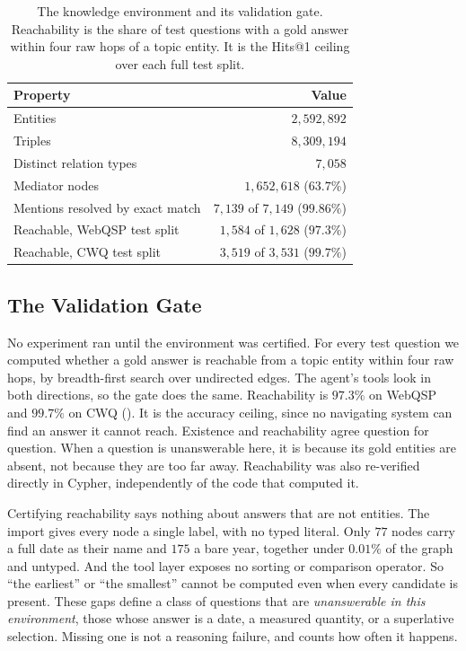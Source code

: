 \begin{table}[!t]
\caption{The knowledge environment and its validation gate. Reachability is the
  share of test questions with a gold answer within four raw hops of a topic
  entity. It is the Hits@1 ceiling over each full test split.}
\label{tab:environment}
\centering
\small
\begin{tabular}{@{}lr@{}}
\toprule
Property & Value \\
\midrule
Entities & $2{,}592{,}892$ \\
Triples & $8{,}309{,}194$ \\
Distinct relation types & $7{,}058$ \\
Mediator nodes & $1{,}652{,}618$ ($63.7\%$) \\
Mentions resolved by exact match & $7{,}139$ of $7{,}149$ ($99.86\%$) \\
\midrule
Reachable, WebQSP test split & $1{,}584$ of $1{,}628$ ($97.3\%$) \\
Reachable, CWQ test split & $3{,}519$ of $3{,}531$ ($99.7\%$) \\
\bottomrule
\end{tabular}
\end{table}

\subsection{The Validation Gate}\label{sec:gate}

No experiment ran until the environment was certified. For every test question
we computed whether a gold answer is reachable from a topic entity within four
raw hops, by breadth-first search over undirected edges. The agent's tools look
in both directions, so the gate does the same. Reachability is $97.3\%$ on
WebQSP and $99.7\%$ on CWQ (). It is the accuracy ceiling,
since no navigating system can find an answer it cannot reach. Existence and
reachability agree question for question. When a question is unanswerable here,
it is because its gold entities are absent, not because they are too far away.
Reachability was also re-verified directly in Cypher, independently of the code
that computed it.

Certifying reachability says nothing about answers that are not entities. The
import gives every node a single label, with no typed literal. Only $77$ nodes
carry a full date as their name and $175$ a bare year, together under $0.01\%$
of the graph and untyped. And the tool layer exposes no sorting or comparison
operator. So ``the earliest'' or ``the smallest'' cannot be computed even when
every candidate is present. These gaps define a class of questions that are
\emph{unanswerable in this environment}, those whose answer is a date, a
measured quantity, or a superlative selection. Missing one is not a reasoning
failure, and  counts how often it happens.

\endinput
